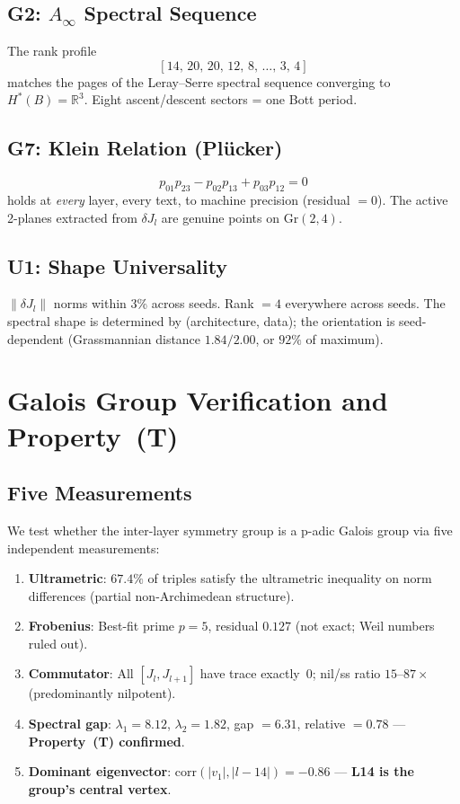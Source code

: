 \documentclass[11pt,a4paper]{article}
\begin{document}
\subsection{G2: $A_\infty$ Spectral Sequence}

The rank profile
\[
[14,\, 20,\, 20,\, 12,\, 8,\, \ldots,\, 3,\, 4]
\]
matches the pages of the Leray--Serre spectral sequence converging to
$H^*(B) = \mathbb{R}^3$.  Eight ascent/descent sectors = one Bott period.

\subsection{G7: Klein Relation (Plücker)}

\[
p_{01}p_{23} - p_{02}p_{13} + p_{03}p_{12} = 0
\]
holds at \emph{every} layer, every text, to machine precision (residual ${=}0$).
The active 2-planes extracted from $\delta J_l$ are genuine points on
$\text{Gr}(2,4)$.

\subsection{U1: Shape Universality}

$\|\delta J_l\|$ norms within 3\% across seeds. Rank ${=}4$ everywhere
across seeds. The spectral shape is determined by (architecture, data);
the orientation is seed-dependent (Grassmannian distance $1.84/2.00$,
or $92\%$ of maximum).

\section{Galois Group Verification and Property~(T)}
\label{sec:galois}

\subsection{Five Measurements}

We test whether the inter-layer symmetry group is a p-adic Galois group
via five independent measurements:

\begin{enumerate}
  \item \textbf{Ultrametric}: $67.4\%$ of triples satisfy the ultrametric
        inequality on norm differences (partial non-Archimedean structure).
  \item \textbf{Frobenius}: Best-fit prime $p{=}5$, residual $0.127$
        (not exact; Weil numbers ruled out).
  \item \textbf{Commutator}: All $[J_l, J_{l+1}]$ have trace exactly~0;
        nil/ss ratio $15$--$87{\times}$ (predominantly nilpotent).
  \item \textbf{Spectral gap}: $\lambda_1 = 8.12$, $\lambda_2 = 1.82$,
        gap $= 6.31$, relative $= 0.78$ --- \textbf{Property~(T) confirmed}.
  \item \textbf{Dominant eigenvector}: $\text{corr}(|v_1|, |l-14|) = -0.86$
        --- \textbf{L14 is the group's central vertex}.
\end{enumerate}
\end{document}
